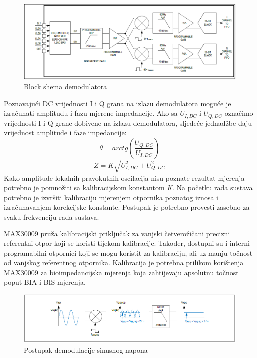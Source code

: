 \documentclass[../diplomski_rad.tex]{subfiles}
\begin{document}
\begin{figure}[htb]
    \centering
    \includegraphics[width=1\textwidth]{Figures/max30009_receive.png} 
    \caption{Block shema demodulatora \cite{max30009_datasheet}}
    \label{slk:max30009_receive}
\end{figure}

Poznavajući DC vrijednosti I i Q grana na izlazu demodulatora moguće je izračunati amplitudu i fazu mjerene impedancije.
Ako sa $U_{I,DC}$ i $U_{Q,DC}$ označimo vrijednosti I i Q grane dobivene na izlazu demodulatora, 
sljedeće jednadžbe daju vrijednost amplitude i faze impedancije:
\begin{equation}
    \label{jed:cpe}
    \theta = arctg(\frac{U_{Q,DC}}{U_{I,DC}})
\end{equation} 
\begin{equation}
    \label{jed:cpe}
    Z = K\sqrt{U_{I,DC}^2+U_{Q,DC}^2}
\end{equation} 
Kako amplitude lokalnih pravokutnih oscilacija nisu poznate rezultat mjerenja potrebno je pomnožiti sa kalibracijskom 
konstantom \textit{K}. Na početku rada sustava potrebno je izvršiti kalibraciju mjerenjem otpornika poznatog iznosa i 
izračunavanjem korekcijske konstante. Postupak je potrebno provesti zasebno za svaku frekvenciju rada sustava.

MAX30009 pruža kalibracijski priključak za vanjski četverožičani precizni referentni otpor koji se koristi tijekom kalibracije. 
Također, dostupni su i interni programabilni otpornici koji se mogu koristit za kalibraciju, ali uz manju točnost od vanjskog referentnog otpornika.
Kalibracija je potrebna prilikom korištenja MAX30009 za bioimpedancijska mjerenja koja zahtijevaju apsolutnu točnost poput BIA i BIS mjerenja.

\begin{figure}[htb]
    \centering
    \includegraphics[width=1\textwidth]{Figures/max30009_demodulator.png} 
    \caption{Postupak demodulacije sinusnog napona \cite{max30009_datasheet}}
    \label{slk:max30009_demodulator}
\end{figure}
\end{document}
